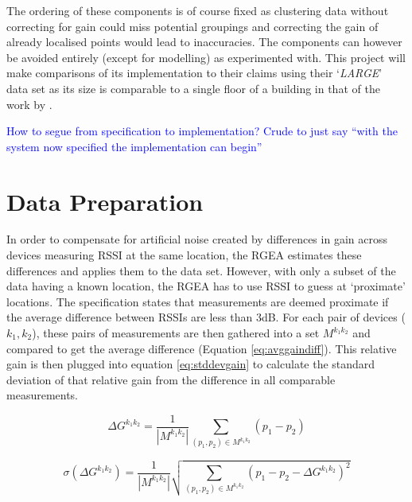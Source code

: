 \documentclass{UoYCSproject}
\begin{document}
            The ordering of these components is of course fixed as clustering data without correcting for gain could miss potential groupings and correcting the gain of already localised points would lead to inaccuracies. The components can however be avoided entirely (except for modelling) as \citeauthor{chintalapudi2010indoor} experimented with. This project will make comparisons of its implementation to their claims using their `\emph{LARGE}' data set as its size is comparable to a single floor of a building in that of the work by \citet{torres2014ujiindoorloc}.
            
            \textcolor{blue}{How to segue from specification to implementation? Crude to just say ``with the system now specified the implementation can begin''}
		
		\section{Data Preparation}
        \label{sec:dataprep}
        
            In order to compensate for artificial noise created by differences in gain across devices measuring RSSI at the same location, the RGEA estimates these differences and applies them to the data set. However, with only a subset of the data having a known location, the RGEA has to use RSSI to guess at `proximate' locations. The specification states that measurements are deemed proximate if the average difference between RSSIs are less than 3dB. For each pair of devices ($k_1,k_2$), these pairs of measurements are then gathered into a set $M^{k_1k_2}$ and compared to get the average difference (Equation \ref{eq:avggaindiff}). This relative gain is then plugged into equation \ref{eq:stddevgain} to calculate the standard deviation of that relative gain from the difference in all comparable measurements.
            
            \begin{equation}
            \label{eq:avggaindiff}
                \Delta G^{k_1k_2}=\dfrac{1}{|M^{k_1k_2}|} \sum_{(p_1,p_2)\in M^{k_1k_2}} (p_1 - p_2)
            \end{equation}
            
            \begin{equation}
            \label{eq:stddevgain}
                \sigma(\Delta G^{k_1k_2})=\dfrac{1}{|M^{k_1k_2}|} \sqrt{\sum_{(p_1,p_2)\in M^{k_1k_2}} (p_1 - p_2 - \Delta G^{k_1k_2})^2}
            \end{equation}
            
\end{document}
